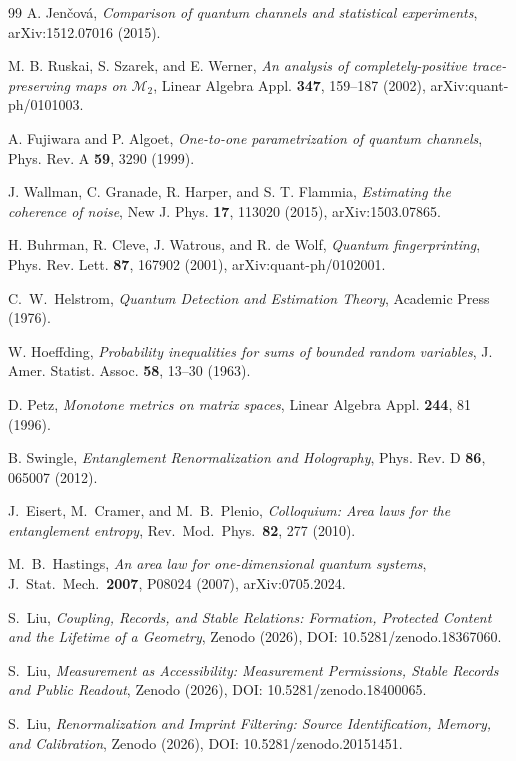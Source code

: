 \documentclass[12pt,a4paper]{article}
\begin{document}
\begin{thebibliography}{99}
A. Jen\v{c}ov\'a, \emph{Comparison of quantum channels and statistical experiments}, arXiv:1512.07016 (2015).

M. B. Ruskai, S. Szarek, and E. Werner, \emph{An analysis of completely-positive trace-preserving maps on $\mathcal M_2$}, Linear Algebra Appl. \textbf{347}, 159--187 (2002), arXiv:quant-ph/0101003.

A. Fujiwara and P. Algoet, \emph{One-to-one parametrization of quantum channels}, Phys. Rev. A \textbf{59}, 3290 (1999).

J. Wallman, C. Granade, R. Harper, and S. T. Flammia, \emph{Estimating the coherence of noise}, New J. Phys. \textbf{17}, 113020 (2015), arXiv:1503.07865.

H. Buhrman, R. Cleve, J. Watrous, and R. de Wolf, \emph{Quantum fingerprinting}, Phys. Rev. Lett. \textbf{87}, 167902 (2001), arXiv:quant-ph/0102001.

C.~W.~Helstrom, \emph{Quantum Detection and Estimation Theory},
Academic Press (1976).

W. Hoeffding, \emph{Probability inequalities for sums of bounded random variables}, J. Amer. Statist. Assoc. \textbf{58}, 13--30 (1963).

D. Petz, \emph{Monotone metrics on matrix spaces}, Linear Algebra Appl. \textbf{244}, 81 (1996).

B. Swingle, \emph{Entanglement Renormalization and Holography}, Phys. Rev. D \textbf{86}, 065007 (2012).

J.~Eisert, M.~Cramer, and M.~B.~Plenio,
\emph{Colloquium: Area laws for the entanglement entropy},
Rev.\ Mod.\ Phys.\ \textbf{82}, 277 (2010).

M.~B.~Hastings,
\emph{An area law for one-dimensional quantum systems},
J.\ Stat.\ Mech.\ \textbf{2007}, P08024 (2007),
arXiv:0705.2024.

S.~Liu, \emph{Coupling, Records, and Stable Relations: Formation, Protected Content and the Lifetime of a Geometry}, Zenodo (2026), DOI: 10.5281/zenodo.18367060.

S.~Liu, \emph{Measurement as Accessibility: Measurement Permissions, Stable Records and Public Readout}, Zenodo (2026), DOI: 10.5281/zenodo.18400065.

S.~Liu, \emph{Renormalization and Imprint Filtering: Source Identification, Memory, and Calibration}, Zenodo (2026), DOI: 10.5281/zenodo.20151451.


\end{thebibliography}
\end{document}
